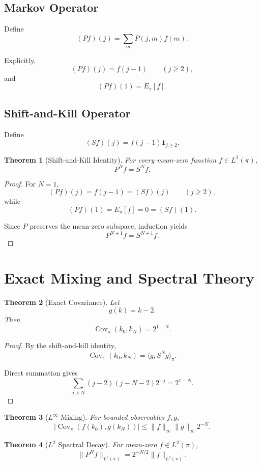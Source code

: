 \documentclass[11pt]{article}
\newtheorem{theorem}{Theorem}[section]
\begin{document}
\subsection{Markov Operator}

Define
\[
(Pf)(j)=\sum_m P(j,m)f(m).
\]

Explicitly,
\[
(Pf)(j)=f(j-1)
\qquad (j\ge2),
\]
and
\[
(Pf)(1)=E_\pi[f].
\]

\subsection{Shift-and-Kill Operator}

Define
\[
(Sf)(j)=f(j-1)\mathbf1_{j\ge2}.
\]

\begin{theorem}[Shift-and-Kill Identity]
For every mean-zero function \(f\in L^2(\pi)\),
\[
P^Nf=S^Nf.
\]
\end{theorem}

\begin{proof}
For \(N=1\),
\[
(Pf)(j)=f(j-1)=(Sf)(j)
\qquad (j\ge2),
\]
while
\[
(Pf)(1)=E_\pi[f]=0=(Sf)(1).
\]

Since \(P\) preserves the mean-zero subspace, induction yields
\[
P^{N+1}f=S^{N+1}f.
\]
\end{proof}

\section{Exact Mixing and Spectral Theory}

\begin{theorem}[Exact Covariance]
Let
\[
g(k)=k-2.
\]
Then
\[
\operatorname{Cov}_\pi(k_0,k_N)=2^{1-N}.
\]
\end{theorem}

\begin{proof}
By the shift-and-kill identity,
\[
\operatorname{Cov}_\pi(k_0,k_N)
=
\langle g,S^Ng\rangle_\pi.
\]

Direct summation gives
\[
\sum_{j>N}(j-2)(j-N-2)2^{-j}=2^{1-N}.
\]
\end{proof}

\begin{theorem}[\(L^\infty\)-Mixing]
For bounded observables \(f,g\),
\[
|\operatorname{Cov}_\pi(f(k_0),g(k_N))|
\le
\|f\|_\infty\|g\|_\infty 2^{-N}.
\]
\end{theorem}

\begin{theorem}[\(L^2\) Spectral Decay]
For mean-zero \(f\in L^2(\pi)\),
\[
\|P^Nf\|_{L^2(\pi)}
=
2^{-N/2}\|f\|_{L^2(\pi)}.
\]
\end{theorem}
\end{document}
